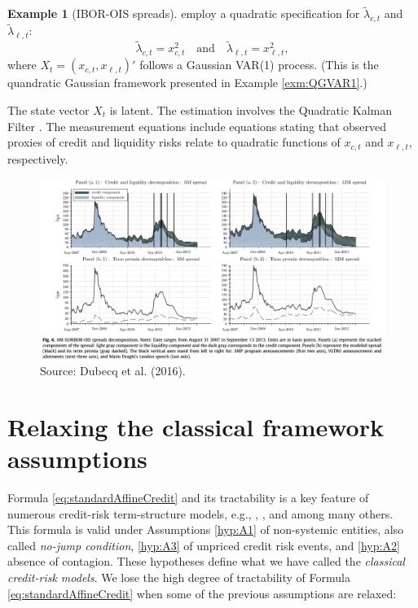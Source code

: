 \documentclass[
  12pt,
]{book}
\theoremstyle{definition}
\theoremstyle{definition}
\newtheorem{example}{Example}[chapter]
\theoremstyle{definition}
\theoremstyle{definition}
\theoremstyle{remark}
\begin{document}
\begin{example}[IBOR-OIS spreads]
\citet{DUBECQ201629} employ a quadratic specification for \(\widetilde{\lambda}_{c, t}\) and \(\widetilde{\lambda}_{\ell, t}\):
\[
\widetilde{\lambda}_{c, t} = x_{c,t}^2 \quad \mbox{and} \quad  \widetilde{\lambda}_{\ell, t} = x_{\ell,t}^2,
\]
where \(X_t = (x_{c,t},x_{\ell,t})'\) follows a Gaussian VAR(1) process. (This is the quandratic Gaussian framework presented in Example \ref{exm:QGVAR1}.)

The state vector \(X_t\) is latent. The estimation involves the Quadratic Kalman Filter \citep{Monfort_Renne_Roussellet_2015}. The measurement equations include equations stating that observed proxies of credit and liquidity risks relate to quadratic functions of \(x_{c,t}\) and \(x_{\ell,t}\), respectively.

\begin{figure}

{\centering \includegraphics[width=0.95\linewidth]{figures/IBOROIS} 

}

\caption{Source: Dubecq et al. (2016).}\label{fig:IBOROIS}
\end{figure}

\end{example}

\hypertarget{Creditrelaxing}{%
\section{Relaxing the classical framework assumptions}\label{Creditrelaxing}}

Formula \eqref{eq:standardAffineCredit} and its tractability is a key feature of numerous credit-risk term-structure models, e.g., \citet{Duffie_Singleton_2003}, \citet{Pan_Singleton_2008}, and \citet{Longstaff_Pan_Pedersen_Singleton_2011} among many others. This formula is valid under Assumptions \ref{hyp:A1} of non-systemic entities, also called \emph{no-jump condition}, \ref{hyp:A3} of unpriced credit risk events, and \ref{hyp:A2} absence of contagion. These hypotheses define what we have called the \emph{classical credit-risk models}. We lose the high degree of tractability of Formula \eqref{eq:standardAffineCredit} when some of the previous assumptions are relaxed:
\end{document}
